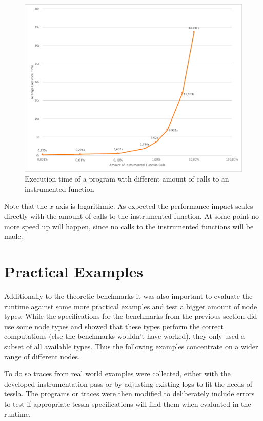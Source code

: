 \begin{figure}
  \includegraphics[width=\textwidth]{gfx/instrumentation_amount_benchmark}
  \caption{Execution time of a program with different amount of calls to an instrumented function}
\label{fig:chap_eval:instrument_benchmark_amount_results}
\end{figure}

Note that the \(x\)-axis is logarithmic.
As expected the performance impact scales directly with the amount of calls to the instrumented function.
At some point no more speed up will happen, since no calls to the instrumented functions will be made.

\section{Practical Examples}
\label{sec:evaluation:runtime_examples}

Additionally to the theoretic benchmarks it was also important to evaluate the runtime against some more practical examples and test a bigger amount of node types.
While the specifications for the benchmarks from the previous section did use some node types and showed that these types perform the correct computations (else the benchmarks wouldn't have worked), they only used a subset of all available types.
Thus the following examples concentrate on a wider range of different nodes.

To do so traces from real world examples were collected, either with the developed instrumentation pass or by adjusting existing logs to fit the needs of \gls{tessla}.
The programs or traces were then modified to deliberately include errors to test if appropriate \gls{tessla} specifications will find them when evaluated in the runtime.

